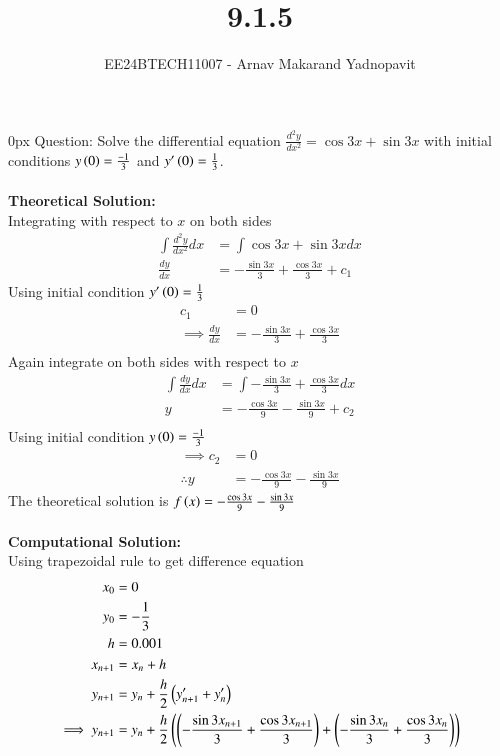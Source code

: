 \documentclass[journal,12pt,onecolumn]{IEEEtran}
\theoremstyle{remark}
\begin{document}
\title{9.1.5}
\author{EE24BTECH11007 - Arnav Makarand Yadnopavit}
\maketitle
\renewcommand{\thefigure}{\theenumi}
\renewcommand{\thetable}{\theenumi}
\parindent 0px Question: Solve the differential equation $\frac{d^2y}{dx^2}=\cos3x+\sin3x$ with initial conditions $y\left(0\right)=\frac{-1}{3}$ and $y^\prime\left(0\right)=\frac{1}{3}$. \\
\solution\\
\textbf{Theoretical Solution:}\\
Integrating with respect to $x$ on both sides
\begin{align}
    \int\frac{d^2y}{dx^2}dx&=\int \cos3x+\sin3xdx \label{eq:first}\\
    \frac{dy}{dx}&=-\frac{\sin3x}{3}+\frac{\cos3x}{3}+c_1    
\end{align}
Using initial condition $y^\prime\left(0\right)=\frac{1}{3}$
\begin{align}
    c_1&=0\\
    \implies\frac{dy}{dx}&=-\frac{\sin3x}{3}+\frac{\cos3x}{3}\\
\end{align}
Again integrate on both sides with respect to $x$
\begin{align}
    \int \frac{dy}{dx} dx&=\int -\frac{\sin3x}{3}+\frac{\cos3x}{3} dx\\
    y&=-\frac{\cos3x}{9}-\frac{\sin3x}{9}+c_2\\
\end{align}
Using initial condition $y\left(0\right)=\frac{-1}{3}$
\begin{align}
    \implies c_2&=0\\
    \therefore y&=-\frac{\cos3x}{9}-\frac{\sin3x}{9}
\end{align}
The theoretical solution is $f\left(x\right)=-\frac{\cos3x}{9}-\frac{\sin3x}{9}$\\\\
\textbf{Computational Solution:}\\
Using trapezoidal rule to get difference equation
\begin{align}
    x_0&=0\\
    y_0&=-\frac{1}{3}\\
    h&=0.001\\
    x_{n+1}&=x_{n}+h\\
    y_{n+1}&=y_n+\frac{h}{2}\left(y^\prime_{n+1}+y^\prime_{n}\right)\\
    \implies y_{n+1}&=y_n+\frac{h}{2}\left(\left(-\frac{\sin3x_{n+1}}{3}+\frac{\cos3x_{n+1}}{3}\right)+\left(-\frac{\sin3x_{n}}{3}+\frac{\cos3x_n}{3}\right)\right)
\end{align}
\end{document}
